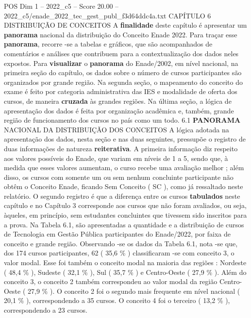 \begin{textsample}{POS Dim 1 – 2022\_c5 – Score 20.00 – 2022\_c5/enade\_2022\_tec\_gest\_publ\_f3d64ddc4a.txt}  \label{ex:f1_pos_025}
CAPÍTULO 6 DISTRIBUIÇÃO DE CONCEITOS A \textbf{finalidade} deste capítulo é apresentar um \textbf{panorama} nacional da distribuição do Conceito Enade 2022.
Para traçar esse \textbf{panorama}, recorre -se a tabelas e gráficos, que são acompanhados de comentários e análises que contribuem para a contextualização dos dados neles expostos.
Para \textbf{visualizar} o \textbf{panorama} do Enade/2002, em nível nacional, na primeira seção do capítulo, os dados sobre o número de cursos participantes são organizados por grande região.
Na segunda seção, o mapeamento do conceito do exame é feito por categoria administrativa das IES e modalidade de oferta dos cursos, de maneira \textbf{cruzada} às grandes regiões.
Na última seção, a lógica de apresentação dos dados é feita por organização acadêmica e, também, grande região de funcionamento dos cursos no país como um todo. 6.1 \textbf{PANORAMA} NACIONAL DA DISTRIBUIÇÃO DOS CONCEITOS A lógica adotada na apresentação dos dados, nesta seção e nas duas seguintes, pressupõe o registro de duas informações de natureza \textbf{reiterativa}.
A primeira informação diz respeito aos valores possíveis do Enade, que variam em níveis de 1 a 5, sendo que, à medida que esses valores aumentam, o curso recebe uma avaliação melhor ; além disso, os cursos com somente um ou sem nenhum concluinte participante não obtêm o Conceito Enade, ficando Sem Conceito ( SC ), como já ressaltado neste relatório.
O segundo registro é que a diferença entre os cursos \textbf{tabulados} neste capítulo e no Capítulo 3 corresponde aos cursos que não foram avaliados, ou seja, àqueles, em princípio, sem estudantes concluintes que tivessem sido inscritos para a prova.
Na Tabela 6.1, são apresentadas a quantidade e a distribuição de cursos de Tecnologia em Gestão Pública participantes do Enade/2022, por faixa de conceito e grande região.
Observando -se os dados da Tabela 6.1, nota -se que, dos 174 cursos participantes, 62 ( 35,6 \% ) classificaram -se com conceito 3, o valor modal.
Esse foi também o conceito modal na maioria das regiões : Nordeste ( 48,4 \% ), Sudeste ( 32,1 \% ), Sul ( 35,7 \% ) e Centro-Oeste ( 27,9 \% ).
Além do conceito 3, o conceito 2 também correspondeu ao valor modal da região Centro-Oeste ( 27,9 \% ).
O conceito 2 foi o segundo mais frequente em nível nacional ( 20,1 \% ), correspondendo a 35 cursos.
O conceito 4 foi o terceiro ( 13,2 \% ), correspondendo a 23 cursos.

\end{textsample}
